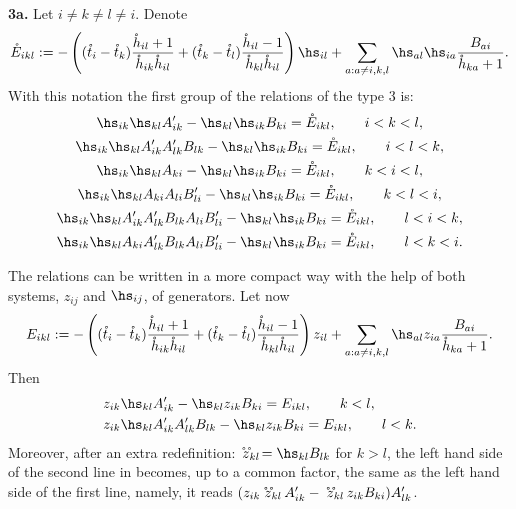\documentclass[pdftex]{sigma}
\def\nplus{\mathfrak{n}}\def\nn{\nonumber}\def\nin{\noindent}
\def\s{z}\def\S{\mathrm {S}}\def\si{\sigma}\def\Sp{\S^{\nplus}}\def\sy{\acute{\sigma}}\def\th{\mathring{h}}
\def\tphi{A}\def\tpsi{A'}\def\tphiplus{B}\def\tpsiminus{B'}\def\ttphi{B}\def\ttpsi{B'}\def\ts{\hskip1pt}\def\tts{\hskip.5pt}
\def\tt{\mathring{t}}\def\U{\mathrm{U}}\def\Uh{\overline{\U}(\h)}\def\UU{\overline{\U}}\def\UUh{{\cal{D}}(\h)}
\numberwithin{equation}{section}
\begin{document}
{\bf 3a.} Let $i\neq k\neq l\neq i$. Denote
\begin{gather*}
\mathring{E}_{ikl}:=-\left((\tt_i-\tt_k) \frac{\th_{il}+1}{\th_{ik}\th_{il}}+(\tt_k-\tt_l) \frac{\th_{il}-1}{\th_{kl}\th_{il}}\right)\hs_{il}+\sum_{a:a\neq i,k,l}
\hs_{al}\hs_{ia} \frac{\ttphi_{ai}}{\th_{ka}+1} .
\end{gather*}
With this notation the f\/irst group of the relations of the type 3 is:
\begin{gather}\notag\hs_{ik}\hs_{kl}\tpsi_{ik} -\hs_{kl}\hs_{ik}\ttphi_{ki}
=\mathring{E}_{ikl} , \qquad i<k<l ,\\   \notag
\hs_{ik}\hs_{kl}\tpsi_{ik}\tpsi_{lk}\ttphi_{lk} -\hs_{kl}\hs_{ik}\ttphi_{ki}
=\mathring{E}_{ikl}  , \qquad i<l<k ,\\
\label{relation3}
\hs_{ik}\hs_{kl}\tphi_{ki} -\hs_{kl}\hs_{ik}\ttphi_{ki}=\mathring{E}_{ikl} , \qquad  k<i<l ,\\
\notag \hs_{ik}\hs_{kl}\tphi_{ki}\tphi_{li}\ttpsi_{li} -\hs_{kl}\hs_{ik}\ttphi_{ki}
=\mathring{E}_{ikl}  ,\qquad  k<l<i ,\\
\notag \hs_{ik}\hs_{kl}\tpsi_{ik}\tpsi_{lk}\ttphi_{lk}\tphi_{li}\ttpsi_{li}-\hs_{kl}\hs_{ik}\ttphi_{ki}
 =\mathring{E}_{ikl}  , \qquad l<i<k , \\  \notag
\hs_{ik}\hs_{kl}\tphi_{ki}\tpsi_{lk}\ttphi_{lk}\tphi_{li}\ttpsi_{li}
-\hs_{kl}\hs_{ik}\ttphi_{ki}=\mathring{E}_{ikl} , \qquad l<k<i .
\end{gather}

The relations  can be written in a more compact way with the help of both systems, $\s_{ij}$ and $\hs_{ij}$, of generators. Let now
\begin{gather*}
E_{ikl}:=-\left((\tt_i-\tt_k) \frac{\th_{il}+1}{\th_{ik}\th_{il}}+(\tt_k-\tt_l) \frac{\th_{il}-1}{\th_{kl}\th_{il}}\right)
\s_{il}+\sum_{a:a\neq i,k,l}
\hs_{al}\s_{ia} \frac{\ttphi_{ai}}{\th_{ka}+1} .
\end{gather*}
Then
\begin{gather}
\begin{split}
& \s_{ik}\hs_{kl}\tpsi_{ik} -\hs_{kl}\s_{ik}\ttphi_{ki}=E_{ikl} ,\qquad k<l,\\ %
& \s_{ik}\hs_{kl}\tpsi_{ik}\tpsi_{lk}\ttphi_{lk} -\hs_{kl}\s_{ik}\ttphi_{ki}=E_{ikl} ,\qquad l<k .
\end{split}
\label{shfo3a}
\end{gather}
Moreover, after an extra redef\/inition: $\!\mathring{\hspace{.1cm}z}_{kl}\!\!\!\!\!\!\mathring{\phantom{z}}\ =\hs_{kl}\ttphi_{lk}$ for $k>l$, the left hand side of the
second line in  becomes, up to a common factor, the same as the left hand side of the f\/irst line, namely, it reads $(\s_{ik}
\mathring{\hspace{.1cm}z}_{kl}\!\!\!\!\!\!\mathring{\phantom{z}}\ \ \tpsi_{ik} -\mathring{\hspace{.1cm}z}_{kl}\!\!\!\!\!\!\mathring{\phantom{z}}\ \ \s_{ik}\ttphi_{ki})
\tpsi_{lk}$.
\end{document}
